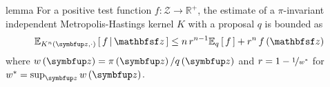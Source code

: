 \begin{theoremEnd}{lemma}\label{thm:imh_expecation}
  For a positive test function \(f : \mathcal{Z} \rightarrow \mathbb{R}^{+}\), the estimate of a \(\pi\)-invariant independent Metropolis-Hastings kernel \(K\) with a proposal \(q\) is bounded as
  \begin{align*}
    \Esub{K^n\left(\vz, \cdot\right)}{ f \,\middle|\, \rvvz }
    \leq
    n \, r^{n-1} 
    \Esub{q}{f}
    +
    {r}^n \, f\left(\rvvz\right)
  \end{align*}
  where \(w\left(\vz\right) = \pi\left(\vz\right) / q\left(\vz\right)\) and \(r = 1 - \nicefrac{1}{w^*}\) for \(w^* = \sup_{\vz} w\left(\vz\right) \).
\end{theoremEnd}
